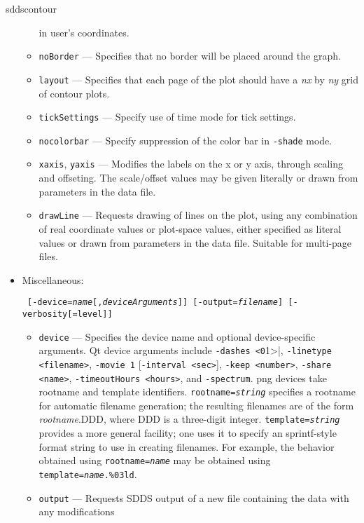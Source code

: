 \begin{sddsprog}{sddscontour}
\begin{itemize}
\begin{itemize}
        in user's coordinates.  
        \item \verb|noBorder| --- Specifies that no border will be placed around the graph.
        \item \verb|layout| --- Specifies that each page of the plot should have a {\em nx} by {\em ny} grid of contour plots.
        \item \verb|tickSettings| --- Specify use of time mode for tick settings.
        \item \verb|nocolorbar| --- Specify suppression of the color bar in \verb|-shade| mode.
        \item \verb|xaxis|, \verb|yaxis| --- Modifies the labels on the x or y axis, through scaling and offseting.
          The scale/offset values may be given literally or drawn from parameters in the data file.
        \item \verb|drawLine| --- Requests drawing of lines on the plot, using any combination of real coordinate values
          or plot-space values, either specified as literal values or drawn from parameters in the data file.
          Suitable for multi-page files.
        \end{itemize}
    \item Miscellaneous:
\begin{flushleft}{\tt
[-device={\em name}[,{\em deviceArguments}]] 
[-output={\em filename}] [-verbosity[=level]]
}\end{flushleft}
        \begin{itemize}
        \item \verb|device| --- Specifies the device name and optional device-specific arguments. Qt device
        arguments include \verb|-dashes <0|1>|, \verb|-linetype <filename>|, \verb|-movie 1| [\verb|-interval <sec>|],
        \verb|-keep <number>|, \verb|-share <name>|, \verb|-timeoutHours <hours>|, and \verb|-spectrum|. png devices
        take rootname and template identifiers. {\tt rootname={\em string}} specifies a rootname
        for automatic filename generation; the resulting filenames are of the form {\em rootname}.DDD, where DDD
        is a three-digit integer. {\tt template={\em string}} provides a more general facility; one uses it to
        specify an sprintf-style format string to use in creating filenames. For example, the behavior obtained
        using {\tt rootname={\em name}} may be obtained  using {\tt template={\em name}.\%03ld}.
        \item \verb|output| --- Requests SDDS output of a new file containing the data with any modifications

\end{itemize}
\end{itemize}
\end{sddsprog}
